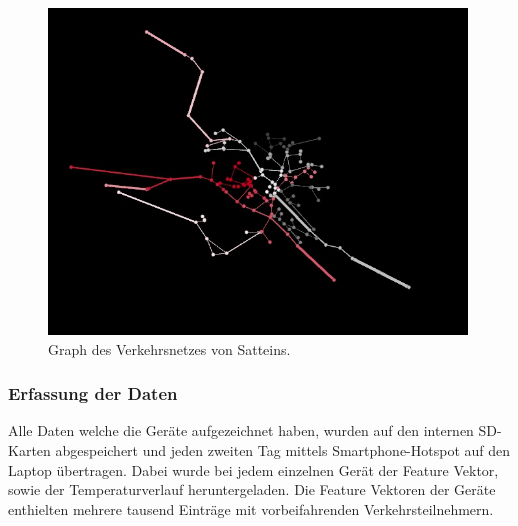 \begin{figure}[H]
  \centering
  \includegraphics[width=0.99\textwidth]{Resultate/Topologie.jpg} 
  \caption{Graph des Verkehrsnetzes von Satteins.}
  \label{bGraph}
\end{figure}

\subsubsection{Erfassung der Daten}
Alle Daten welche die Geräte aufgezeichnet haben, wurden auf den internen SD-Karten abgespeichert und jeden zweiten Tag mittels Smartphone-Hotspot auf den Laptop übertragen. Dabei wurde bei jedem einzelnen Gerät der Feature Vektor, sowie der Temperaturverlauf heruntergeladen. Die Feature Vektoren der Geräte enthielten mehrere tausend Einträge mit vorbeifahrenden Verkehrsteilnehmern.